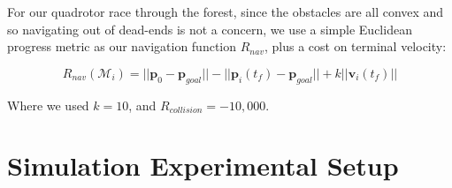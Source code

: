 \documentclass{llncs}
\begin{document}
For our quadrotor race through the forest, since the obstacles are all convex and so navigating out of dead-ends is not a concern, we use a simple Euclidean progress metric as our navigation function $R_{nav}$, plus a cost on terminal velocity:

\begin{equation}
R_{nav}(\mathcal{M}_i) = ||\mathbf{p}_0 - \mathbf{p}_{goal}|| - ||\mathbf{p}_i(t_f) - \mathbf{p}_{goal}|| + k || \mathbf{v}_i(t_f)||
\end{equation}

Where we used $k=10$, and $R_{collision} = -10,000$.




\section{Simulation Experimental Setup}
\end{document}
